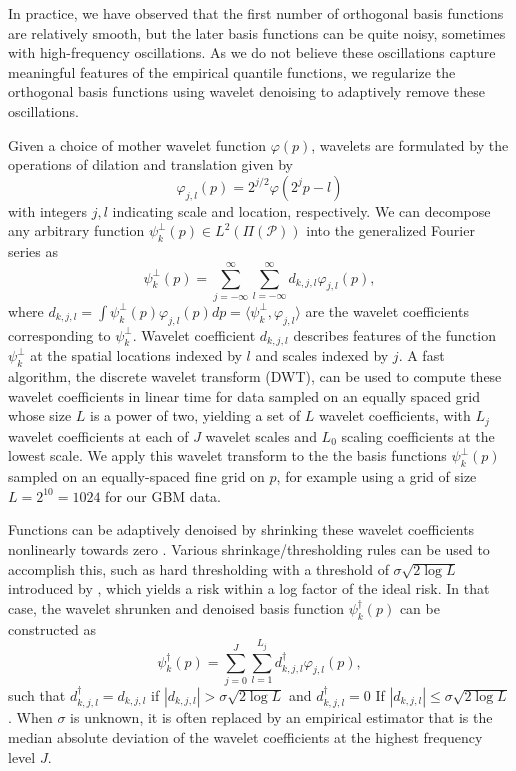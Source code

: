 \documentclass[11pt]{article}
\begin{document}
  In practice, we have observed that the first number of orthogonal basis functions are relatively smooth, but the later basis functions can be quite noisy, sometimes with high-frequency oscillations.  As we do not believe these oscillations capture meaningful features of the empirical quantile functions, we regularize the orthogonal basis functions using wavelet denoising to adaptively remove these oscillations.  

 Given a choice of mother wavelet function $\varphi(p)$, wavelets are formulated by the operations of dilation and translation given by  
  $$\varphi_{j,l}(p)=2^{j/2}\varphi(2^j p - l)$$ with integers $j, l$ indicating scale and location, respectively.
We can decompose any arbitrary function $\psi^\perp_k(p) \in L^2(\Pi(\mathcal{P}))$ into the generalized Fourier series as 
 \begin{equation}
 \psi^\perp_k(p) = \sum_{j= -\infty}^{\infty} \sum_{l= -\infty}^{\infty} d_{k,j,l}\varphi_{j,l}(p),
  \end{equation}
where $d_{k,j,l}=\int \psi^\perp_k(p)\varphi_{j,l}(p) dp=\langle \psi^\perp_k, \varphi_{j,l} \rangle$ are the wavelet coefficients corresponding to $\psi^\perp_k$.
Wavelet coefficient $d_{k,j,l}$ describes features of the function $\psi^\perp_k$ at the spatial locations indexed by $l$ and scales indexed by $j$.
 A fast algorithm, the discrete wavelet transform (DWT), can be used to compute these wavelet coefficients in linear time for data sampled on an
 equally spaced grid whose size $L$ is a power of two, yielding a set of $L$ wavelet coefficients, with $L_j$ wavelet coefficients at each of $J$ wavelet scales and $L_0$
 scaling coefficients at the lowest scale. 
 We apply this wavelet transform to the the basis functions $\psi^\perp_k(p)$ sampled on an equally-spaced fine
 grid on $p$, for example using a grid of size $L=2^{10}=1024$ for our GBM data.
 
  Functions can be adaptively denoised by shrinking these wavelet coefficients nonlinearly towards zero \cite{donoho1995wavelet}.  Various shrinkage/thresholding rules can be used to accomplish this, 
such as hard thresholding with a threshold of $\sigma \sqrt{2 \log L}$ introduced by \cite{donoho1995wavelet}, which yields a risk within a log factor of 
the ideal risk.   In that case, the wavelet shrunken and denoised basis function $\psi^{\dagger}_k(p)$ can be constructed as
 \begin{equation}
\psi^{\dagger}_k(p) = \sum_{j= 0}^J \sum_{l= 1}^{L_j} d_{k,j,l}^{\dagger}\varphi_{j,l}(p),
  \end{equation}
such that  $d_{k,j,l}^{\dagger}=d_{k,j,l}$ if $|d_{k,j,l}|>\sigma \sqrt{2 \log L}$ and $d_{k,j,l}^{\dagger}=0$ If $|d_{k,j,l}|\le \sigma \sqrt{2 \log L}$.
When $\sigma$ is unknown, it is often replaced by an empirical estimator that is the median absolute deviation of the wavelet coefficients at the highest frequency level $J$.
\end{document}

